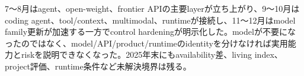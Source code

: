 
7〜8月はagent、open-weight、frontier APIの主要layerが立ち上がり、9〜10月はcoding agent、tool/context、multimodal、runtimeが接続し、11〜12月はmodel family更新が加速する一方でcontrol hardeningが明示化した。modelが不要になったのではなく、model/API/product/runtimeのidentityを分けなければ実用能力とriskを説明できなくなった。2025年末にもavailability差、living index、project評価、runtime条件など未解決境界は残る。\autocite{src-05738f6c55b7,src-12865e8612c7,src-1c46fdf17c79,src-43eaa2f12960,src-455a78bc36fa,src-58ef6e84aa65,src-7a7213b68631,src-964121647555,src-a24fd97eb3d0,src-ad13fe7d3321,src-aec54e92a7f3,src-b074ccdb2d9e,src-dd5d9b8662f3,src-f6aa679babd7}
